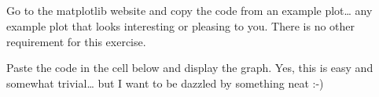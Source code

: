 \documentclass[11pt]{article}
\begin{document}
    \begin{center}
    \end{center}
    { \hspace*{\fill} \\}
    
    \begin{center}
    \end{center}
    { \hspace*{\fill} \\}
    
    \begin{center}
    \end{center}
    { \hspace*{\fill} \\}
    
    \begin{center}
    \end{center}
    { \hspace*{\fill} \\}
    
    Go to the matplotlib website and copy the code from an example
plot\ldots{} any example plot that looks interesting or pleasing to you.
There is no other requirement for this exercise.

Paste the code in the cell below and display the graph. Yes, this is
easy and somewhat trivial\ldots{} but I want to be dazzled by something
neat :-)
\end{document}
